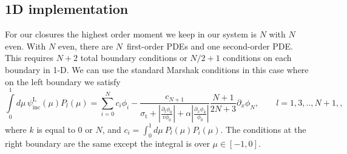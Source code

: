 \documentclass[review]{elsarticle}
\newcommand{\ppz}{\partial_x}%
\newcommand{\psii}[1]{\phi_\ensuremath{{#1}}}
\begin{document}
\subsection{1D implementation}
For our closures the highest order moment we keep in our system is $N$ with $N$ even.  With $N$ even, there are $N$\ first-order PDEs and one second-order PDE.  This requires $N+2$ total boundary conditions or $N/2 + 1$ conditions on each boundary in 1-D. We can use the standard Marshak conditions in this case where on the left boundary we satisfy 
\begin{equation}\label{e:bdy}
\int\limits_{0}^{1}\!d\mu\,\psi_{\mathrm{inc}}^\mathrm{L}(\mu)P_l(\mu)=\sum\limits_{i=0}^{N}c_i\psii{i}-\frac{c_{N+1}}{\sigma_\mathrm{t}+\displaystyle\left|\frac{\partial_t\psii{0}}{v\psii{0}}\right|+\alpha\left|\frac{\partial_x\psii{k}}{\psii{0}}\right|}\frac{N+1}{2N+3}\ppz\psii{N}, \qquad l=1,3,..,{N+1},,
\end{equation}
where $k$ is equal to $0$ or $N$, and $\displaystyle c_i=\int_{0}^1d\mu~P_l(\mu)P_i(\mu)$. The conditions at the right boundary are the same except the integral is over $\mu\in[-1,0]$. 
\end{document}
